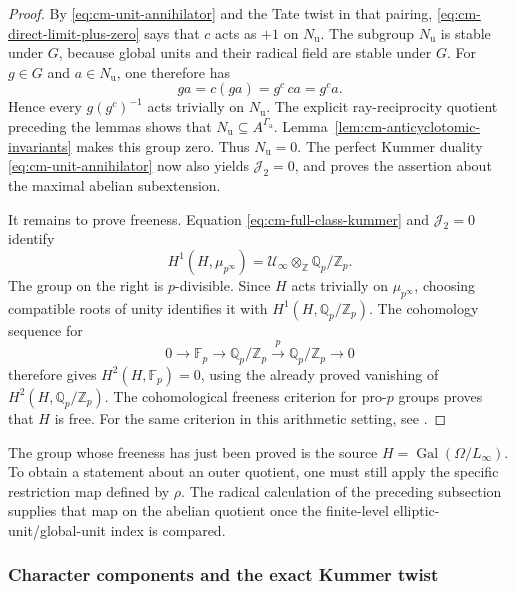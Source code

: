 \documentclass[11pt]{article}
\theoremstyle{definition}\newtheorem{definition}[theorem]{Definition}
\begin{document}
\begin{proof}
By \eqref{eq:cm-unit-annihilator} and the Tate twist in that
pairing, \eqref{eq:cm-direct-limit-plus-zero} says that \(c\)
acts as \(+1\) on \(N_{\mathrm u}\).
The subgroup \(N_{\mathrm u}\) is stable under \(G\), because
global units and their radical field are stable under \(G\).
For \(g\in G\) and \(a\in N_{\mathrm u}\), one therefore has
\[
                    ga=c(ga)=g^c\,ca=g^c a.
\]
Hence every \(g(g^c)^{-1}\) acts trivially on \(N_{\mathrm u}\).
The explicit ray-reciprocity quotient preceding the lemmas shows
that \(N_{\mathrm u}\subseteq A^{\Gamma_{\mathrm a}}\).
Lemma~\ref{lem:cm-anticyclotomic-invariants} makes this group zero.
Thus \(N_{\mathrm u}=0\).
The perfect Kummer duality
\eqref{eq:cm-unit-annihilator} now also yields
\(\mathcal J_2=0\), and proves the assertion about the maximal
abelian subextension.

It remains to prove freeness.
Equation \eqref{eq:cm-full-class-kummer} and
\(\mathcal J_2=0\) identify
\[
 H^1(H,\mu_{p^\infty})
       =\mathcal U_\infty\otimes_{\mathbb Z}
                                     \mathbb Q_p/\mathbb Z_p.
\]
The group on the right is \(p\)-divisible.
Since \(H\) acts trivially on \(\mu_{p^\infty}\), choosing
compatible roots of unity identifies it with
\(H^1(H,\mathbb Q_p/\mathbb Z_p)\).
The cohomology sequence for
\[
 0\longrightarrow\mathbb F_p
  \longrightarrow\mathbb Q_p/\mathbb Z_p
  \xrightarrow{p}\mathbb Q_p/\mathbb Z_p
  \longrightarrow0
\]
therefore gives \(H^2(H,\mathbb F_p)=0\), using the already
proved vanishing of \(H^2(H,\mathbb Q_p/\mathbb Z_p)\).
The cohomological freeness criterion for pro-\(p\) groups proves
that \(H\) is free.
For the same criterion in this arithmetic setting, see
\cite[Theorem 4.17 and its proof, author version p.~33]
{VenjakobIwasawa}.
\end{proof}

The group whose freeness has just been proved is the
source \(H=\operatorname{Gal}(\Omega/L_\infty)\).
To obtain a statement about an outer quotient, one must still
apply the specific restriction map defined by \(\rho\).
The radical calculation of the preceding subsection supplies
that map on the abelian quotient once the finite-level
elliptic-unit/global-unit index is compared.

\subsubsection{Character components and the exact Kummer twist}
\end{document}
